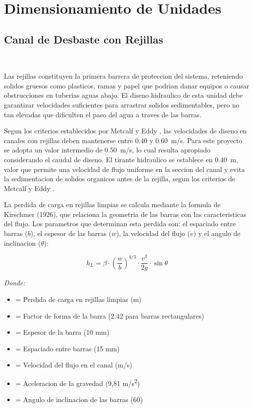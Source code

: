 \documentclass[12pt,a4paper]{article}
\begin{document}
\newpage
\section{Dimensionamiento de Unidades}

\subsection{Canal de Desbaste con Rejillas}

\

Las rejillas constituyen la primera barrera de proteccion del sistema, reteniendo solidos gruesos como plasticos, ramas y papel que podrian danar equipos o causar obstrucciones en tuberias aguas abajo. El diseno hidraulico de esta unidad debe garantizar velocidades suficientes para arrastrar solidos sedimentables, pero no tan elevadas que dificulten el paso del agua a traves de las barras.

Segun los criterios establecidos por Metcalf y Eddy \cite{metcalf2014}, las velocidades de diseno en canales con rejillas deben mantenerse entre 0.40 y 0.60~m/s. Para este proyecto se adopta un valor intermedio de 0.50~m/s, lo cual resulta apropiado considerando el caudal de diseno. El tirante hidraulico se establece en 0.40~m, valor que permite una velocidad de flujo uniforme en la seccion del canal y evita la sedimentacion de solidos organicos antes de la rejilla, segun los criterios de Metcalf y Eddy \cite{metcalf2014}.

La perdida de carga en rejillas limpias se calcula mediante la formula de Kirschmer (1926), que relaciona la geometria de las barras con las caracteristicas del flujo. Los parametros que determinan esta perdida son: el espaciado entre barras ($b$), el espesor de las barras ($w$), la velocidad del flujo ($v$) y el angulo de inclinacion ($\theta$):

\begin{equation}
h_L = \beta \cdot \left(\frac{w}{b}\right)^{4/3} \cdot \frac{v^2}{2g} \cdot \sin\theta
\end{equation}

\textit{Donde:}
\begin{itemize}[noitemsep,leftmargin=2em]
    \item[$h_L$] = Perdida de carga en rejillas limpias (m)
    \item[$\beta$] = Factor de forma de la barra (2.42 para barras rectangulares)
    \item[$w$] = Espesor de la barra (10 mm)
    \item[$b$] = Espaciado entre barras (15 mm)
    \item[$v$] = Velocidad del flujo en el canal (m/s)
    \item[$g$] = Aceleracion de la gravedad (9,81 m/s\textsuperscript{2})
    \item[$\theta$] = Angulo de inclinacion de las barras (60\textdegree)
\end{itemize}
\end{document}
